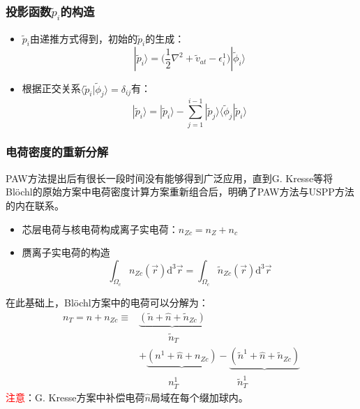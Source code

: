 \documentclass[cjk,slidestop,compress,mathserif,blue]{beamer}
\begin{document}
\frame
{
	\frametitle{投影函数$\tilde p_i$的构造}
	\begin{itemize}
		\item $\tilde p_i$由递推方式得到，初始的$\tilde p_i$的生成：
			$$|\tilde p_i\rangle=\biggl(\dfrac12\nabla^2+\tilde v_{at}-\epsilon_i^1\biggr)|\tilde\phi_i\rangle$$
		\item 根据正交关系$\langle\tilde p_i|\tilde\phi_j\rangle=\delta_{ij}$有：
			$$|\tilde p_i\rangle=|\tilde p_i\rangle-\sum_{j=1}^{i-1}|\tilde p_j\rangle\langle\tilde\phi_j|\tilde p_i\rangle$$
		\end{itemize}
}

\frame
{
\frametitle{电荷密度的重新分解}
\textrm{PAW}方法提出后有很长一段时间没有能够得到广泛应用，直到\textrm{G. Kresse}等将\textrm{Bl\"ochl}的原始方案中电荷密度计算方案重新组合后，明确了\textrm{PAW}方法与\textrm{USPP}方法的内在联系。
\begin{itemize}
	\item 芯层电荷与核电荷构成离子实电荷：$n_{Zc}=n_Z+n_c$
	\item 赝离子实电荷的构造$$\int_{\Omega_c}n_{Zc}(\vec r)\mathrm{d}^3\vec r=\int_{\Omega_c}\tilde n_{Zc}(\vec r)\mathrm{d}^3\vec r$$
\end{itemize}
在此基础上，\textrm{Bl\"ochl}方案中的电荷可以分解为：
\begin{displaymath}
	\begin{aligned}
		n_T=n+n_{Zc}\equiv&\underbrace{(\tilde n+\hat n+\tilde n_{Zc})}\\
				 		&\quad\qquad\tilde n_T\\
				  &+\underbrace{(n^1+\hat n+n_{Zc})}-\underbrace{(\tilde n^1+\hat n+\tilde n_{Zc})}\\
				                  &\quad\qquad n_T^1\qquad\qquad\qquad\tilde n_T^1
	\end{aligned}
\end{displaymath}
\textcolor{red}{注意}：\textrm{G. Kresse}方案中补偿电荷$\hat n$局域在每个缀加球内。
}
\end{document}

